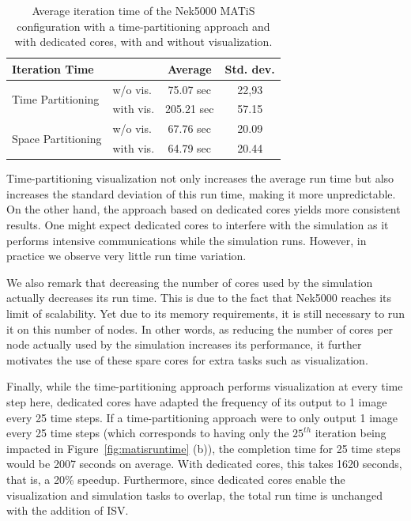 \begin{table}
	\center
\caption[Average iteration time of Nek5000's MATiS configuration]{Average 
	iteration time of the Nek5000 MATiS configuration with a
   time-partitioning approach and with dedicated cores, with and without 
   visualization.}\label{tab:matisstats}
   \begin{tabular}{|l|l|c|c|}
   \hline
\textbf{Iteration Time} & & Average & Std. dev. \\
	\hline
\multirow{2}{*}{Time Partitioning} & w/o vis. & 75.07 sec  & 22,93 \\
	& with vis. & 205.21 sec & 57.15 \\
	\hline
\multirow{2}{*}{Space Partitioning} & w/o vis. & 67.76 sec & 20.09 \\
	& with vis. & 64.79 sec  & 20.44 \\
	\hline
   \end{tabular}
\end{table}

Time-partitioning visualization not only increases the average run time but 
also increases the standard deviation of this run time, making it more unpredictable.
On the other hand, the approach based on dedicated cores yields more consistent results.
One might expect dedicated cores to interfere with the
simulation as it performs intensive communications while the simulation runs. 
However, in practice we observe very little run time variation.

We also remark that decreasing the number of cores used by the simulation actually
decreases its run time. This is due to the fact that Nek5000 reaches its
limit of scalability. Yet due to its memory requirements, it is still necessary to run
it on this number of nodes. In other words, as reducing the number of cores per node
actually used by the simulation increases its performance, it further motivates the
use of these spare cores for extra tasks such as visualization.

Finally, while the  time-partitioning approach performs visualization at every 
time step here, dedicated cores have adapted the frequency of 
its output to 1 image every 25 time steps.
If a time-partitioning approach were to only output 1 image every 25 time steps 
(which corresponds to having only the $25^{th}$ iteration being impacted 
in Figure~\ref{fig:matisruntime} (b)), the completion time for 25 time steps 
would be 2007 seconds on average.
With dedicated cores, this takes 1620 seconds, that is, a 20\% speedup. 
Furthermore, since dedicated cores enable the visualization and 
simulation tasks to overlap, the total run time is unchanged with the addition of ISV.
